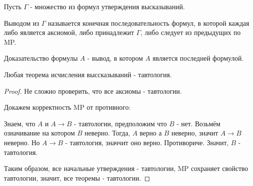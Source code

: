 \begin{definition} \thmslashn 

    Пусть $\Gamma$ - множество из формул утверждения высказываний.

    Выводом из $\Gamma$ называется конечная последовательность формул, в которой каждая либо является аксиомой, либо принадлежит $\Gamma$, либо следует из предыдущих по MP.

\end{definition}

\begin{definition}[Доказательство] \thmslashn 

    Доказательство формулы $A$ - вывод, в котором $A$ является последней формулой.
\end{definition}
\begin{theorem} \thmslashn

    Любая теорема исчисления выссказываний - тавтология.
    \begin{proof} \thmslashn
    
        Не сложно проверить, что все аксиомы - тавтологии.

        Докажем корректность MP от противного:

        Знаем, что $A$ и $A \to B$ - тавтологии, предположим что $B$ - нет. Возьмём означивание на котором $B$ неверно. Тогда, $A$ верно а $B$ неверно, значит $A \to B$ неверно. Но $A \to B$ - тавтология, значчит оно верно. Противориче. Значит, $B$ - тавтология.

        Таким образом, все начальные утверждения - тавтологии, MP сохраняет свойство тавтологии, значит, все теоремы - тавтологии.
    \end{proof}
\end{theorem}


